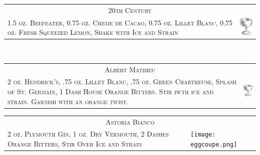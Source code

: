 \documentclass{article}
\begin{document}
\begin{tabular}{b{2.5in} m{0.625in}}
  \multicolumn{2}{c}{\Huge\textsc{20th Century}}\\ 
  \textsc{1.5 oz. Beefeater, 0.75 oz. Creme de
    Cacao, 0.75 oz. Lillet Blanc, 0.75 oz. Fresh Squeezed Lemon, Shake
    with Ice and Strain} &
  \includegraphics[width=0.5in]{coupe.png}
\end{tabular}\\

\begin{tabular}{b{2.5in} m{0.625in}}
  \multicolumn{2}{c}{\Huge\textsc{Albert Mathieu}} \\ 
  \textsc{2 oz. Hendrick's, .75 oz. Lillet Blanc, .75 oz. Green Chartreuse, 
  Splash of St. Germain, 1 Dash House Orange Bitters. 
  Stir iwth ice and strain. Garnish with an orange twist.} &
  \includegraphics[width=0.5in]{coupe.png}
\end{tabular}

\begin{tabular}{b{2.5in} m{0.625in}}
  \multicolumn{2}{c}{\Huge\textsc{Astoria Bianco}} \\ 
  \textsc{2 oz. Plymouth Gin, 1 oz. Dry Vermouth, 2
  Dashes Orange Bitters, Stir Over Ice and Strain} &
  \texttt{[image: eggcoupe.png]}
\end{tabular}
\end{document}
